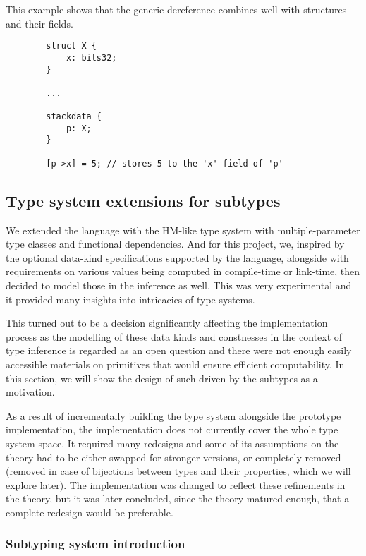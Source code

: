 \begin{ex}
    This example shows that the generic dereference combines well with structures and their fields.

    \begin{lstlisting}
        struct X {
            x: bits32;
        }

        ...

        stackdata {
            p: X;
        }

        [p->x] = 5; // stores 5 to the 'x' field of 'p'
    \end{lstlisting}
\end{ex}

\subsection{Type system extensions for \cmm{} subtypes}

We extended the language with the HM-like type system with multiple-parameter type classes and functional dependencies. And for this project, we, inspired by the optional data-kind specifications supported by the \cmm{} language, alongside with requirements on various values being computed in compile-time or link-time, then decided to model those in the inference as well. This was very experimental and it provided many insights into intricacies of type systems.

This turned out to be a decision significantly affecting the implementation process as the modelling of these data kinds and constnesses in the context of type inference is regarded as an open question and there were not enough easily accessible materials on primitives that would ensure efficient computability. In this section, we will show the design of such driven by the \cmm{} subtypes as a motivation.

As a result of incrementally building the type system alongside the prototype implementation, the implementation does not currently cover the whole type system space. It required many redesigns and some of its assumptions on the theory had to be either swapped for stronger versions, or completely removed (removed in case of bijections between types and their properties, which we will explore later). The implementation was changed to reflect these refinements in the theory, but it was later concluded, since the theory matured enough, that a complete redesign would be preferable.

\subsubsection{Subtyping system introduction}

